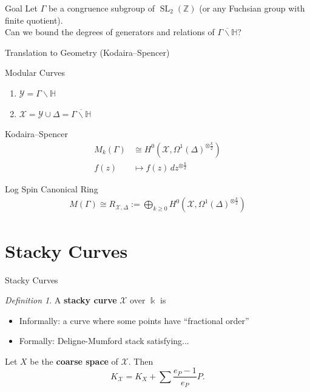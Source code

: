 \documentclass{beamer}
\theoremstyle{remark}
\newtheorem{defn}[thm]{Definition}
\newcommand\BH{{\mathbb H}}
\newcommand\BBZ{{\mathbb Z}}
\newcommand \sx{{\mathscr X}}
\newcommand \sy{{\mathscr Y}}
\newcommand{\SL}{\operatorname{SL}}
\newcommand\Bk{{\Bbbk}}
\begin{document}

\begin{frame}

\begin{block}{Goal}
Let $\Gamma$ be a congruence subgroup of $\SL_2(\BBZ)$ (or any Fuchsian group with finite quotient). \\
Can we bound the degrees of generators and relations of $\overline{\Gamma \backslash \mathbb{H}}$?
\end{block}

\end{frame}


\begin{frame}{Translation to Geometry (Kodaira--Spencer)}
\begin{block}{Modular Curves}
\begin{enumerate}
  \item $\sy = \Gamma \backslash \BH$
  \item $\sx = \sy \cup \Delta = \overline{\Gamma \backslash \BH}$
\end{enumerate}
\end{block}

\begin{block}{Kodaira--Spencer}
\begin{align*}
  M_k(\Gamma) &\cong H^0(\sx, \Omega^1(\Delta)^{\otimes \frac{k}{2}}) \\
	f(z) &\mapsto f(z)\, dz^{\otimes \frac{k}{2}}
\end{align*}
\end{block}

\begin{block}{Log Spin Canonical Ring}
\begin{align*}
  M(\Gamma) \cong R_{\sx,\Delta} := \bigoplus_{k \geq 0} H^0(\sx, \Omega^1(\Delta)^{\otimes \frac{k}{2}})
\end{align*}
\end{block}

\end{frame}

\section{Stacky Curves}

\begin{frame}{Stacky Curves}
\begin{defn}
A \textbf{stacky curve} $\sx$ over $\Bk$
is
	\begin{itemize}
		\item Informally: a curve where some points have ``fractional order''
		\item Formally: Deligne-Mumford stack satisfying...
	\end{itemize}
\end{defn}

\begin{fact}
Let $X$ be the {\bf coarse space} of $\sx$. Then
\[
	K_{\sx} = K_X + \sum \frac{e_P-1}{e_P} P.
\]
\end{fact}
\end{frame}
\end{document}
